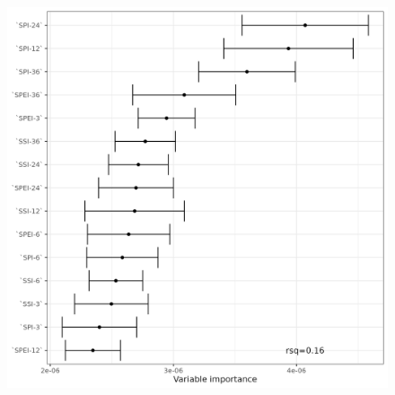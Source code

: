 \documentclass[
  authoryear,
  preprint,
  3p,
  onecolumn]{elsarticle}
\begin{document}
\begin{figure}
\begin{minipage}[t]{0.33\linewidth}
{{\includegraphics{../output/figs/fig_errorbar_resample_random_forest_trends_Cropland.png}

}

}

\end{minipage}%
%
\begin{minipage}[t]{0.33\linewidth}

{\centering 

}
\end{minipage}
\end{figure}
\end{document}
